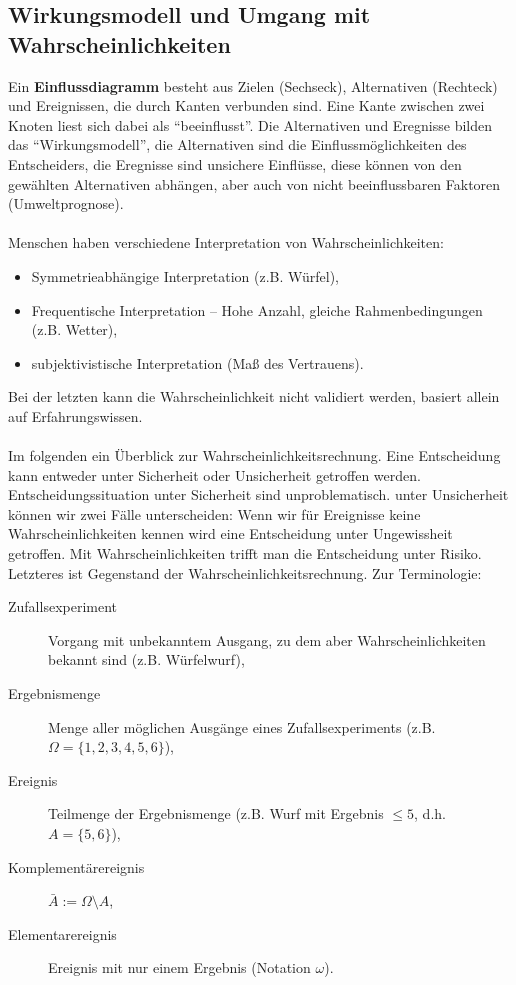 \subsection{Wirkungsmodell und Umgang mit Wahrscheinlichkeiten}
Ein \textbf{Einflussdiagramm} besteht aus Zielen (Sechseck), Alternativen (Rechteck) und Ereignissen, die durch Kanten verbunden sind. Eine Kante zwischen zwei Knoten liest sich dabei als ``beeinflusst''. Die Alternativen und Eregnisse bilden das ``Wirkungsmodell'', die Alternativen sind die Einflussmöglichkeiten des Entscheiders, die Eregnisse sind unsichere Einflüsse, diese können von den gewählten Alternativen abhängen, aber auch von nicht beeinflussbaren Faktoren (Umweltprognose).\\
\ \\
Menschen haben verschiedene Interpretation von Wahrscheinlichkeiten:
\begin{itemize}
	\item Symmetrieabhängige Interpretation (z.B. Würfel),
	\item Frequentische Interpretation -- Hohe Anzahl, gleiche Rahmenbedingungen (z.B. Wetter),
	\item subjektivistische Interpretation (Maß des Vertrauens).
\end{itemize}
Bei der letzten kann die Wahrscheinlichkeit nicht validiert werden, basiert allein auf Erfahrungswissen.\\
\ \\
Im folgenden ein Überblick zur Wahrscheinlichkeitsrechnung. Eine Entscheidung kann entweder unter Sicherheit oder Unsicherheit getroffen werden. Entscheidungssituation unter Sicherheit sind unproblematisch. unter Unsicherheit können wir zwei Fälle unterscheiden: Wenn wir für Ereignisse keine Wahrscheinlichkeiten kennen wird eine Entscheidung unter Ungewissheit getroffen. Mit Wahrscheinlichkeiten trifft man die Entscheidung unter Risiko. Letzteres ist Gegenstand der Wahrscheinlichkeitsrechnung. Zur Terminologie:
\begin{description}
	\item[Zufallsexperiment] Vorgang mit unbekanntem Ausgang, zu dem aber Wahrscheinlichkeiten bekannt sind (z.B. Würfelwurf),
	\item[Ergebnismenge] Menge aller möglichen Ausgänge eines Zufallsexperiments (z.B. \(\Omega=\{1,2,3,4,5,6\}\)),
	\item[Ereignis] Teilmenge der Ergebnismenge (z.B. Wurf mit Ergebnis \(\leq 5\), d.h. \(A=\{5,6\}\)),
	\item[Komplementärereignis] \(\bar{A} := \Omega \setminus A\),
	\item[Elementarereignis] Ereignis mit nur einem Ergebnis (Notation \(\omega\)).
\end{description}
